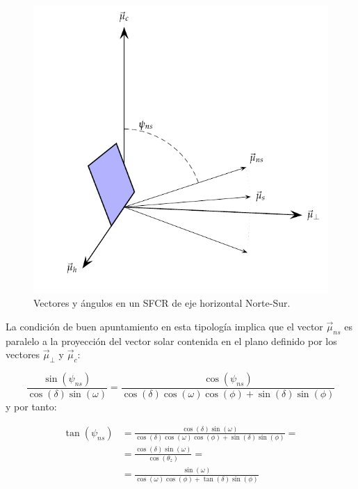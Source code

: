 %
\begin{figure}
\includegraphics[scale=0.85]{../figs/AngulosSistemaHorizontalNS}

\caption{Vectores y ángulos en un SFCR de eje horizontal Norte-Sur.\label{fig:HorizontalNS}}

\end{figure}


La condición de buen apuntamiento en esta tipología implica que el
vector $\vec{\mu}_{ns}$ es paralelo a la proyección del vector solar
contenida en el plano definido por los vectores $\vec{\mu}_{\bot}$
y $\vec{\mu}_{c}$:

\begin{equation}
\frac{\sin(\psi_{ns})}{\cos\left(\delta\right)\sin\left(\omega\right)}=\frac{\cos(\psi_{ns})}{\cos\left(\delta\right)\cos\left(\omega\right)\cos\left(\phi\right)+\sin\left(\delta\right)\sin\left(\phi\right)}\end{equation}
y por tanto:

\begin{align}
\tan(\psi_{ns}) & =\frac{\cos(\delta)\sin(\omega)}{\cos\left(\delta\right)\cos\left(\omega\right)\cos\left(\phi\right)+\sin\left(\delta\right)\sin\left(\phi\right)}=\nonumber \\
 & =\frac{\cos(\delta)\sin(\omega)}{\cos(\theta_{z})}=\nonumber \\
 & =\frac{\sin(\omega)}{\cos(\omega)\cos(\phi)+\tan(\delta)\sin(\phi)}\label{eq:tanPsi_NS1}\end{align}


